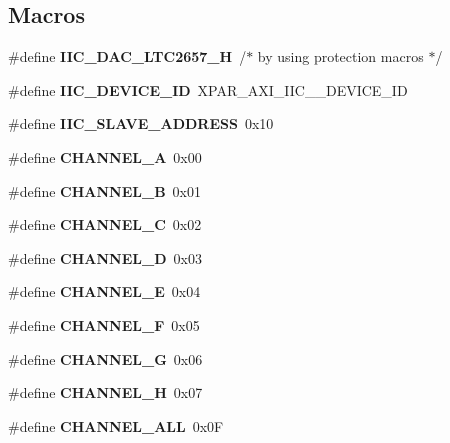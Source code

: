 \subsection*{Macros}
\begin{DoxyCompactItemize}
\item 
\mbox{\label{iic___d_a_c___l_t_c2657_8h_a6f97f5840f25f052ecd761e57bc11d4b}} 
\#define {\bfseries I\+I\+C\+\_\+\+D\+A\+C\+\_\+\+L\+T\+C2657\+\_\+H}~/$\ast$ by using protection macros $\ast$/
\item 
\mbox{\label{iic___d_a_c___l_t_c2657_8h_a0e6e0ffd0c4cccde95481cdd329e887a}} 
\#define {\bfseries I\+I\+C\+\_\+\+D\+E\+V\+I\+C\+E\+\_\+\+ID}~X\+P\+A\+R\+\_\+\+A\+X\+I\+\_\+\+I\+I\+C\+\_\+\_\+\+D\+E\+V\+I\+C\+E\+\_\+\+ID
\item 
\mbox{\label{iic___d_a_c___l_t_c2657_8h_a7f689be1799011edd5f489aac3e9153e}} 
\#define {\bfseries I\+I\+C\+\_\+\+S\+L\+A\+V\+E\+\_\+\+A\+D\+D\+R\+E\+SS}~0x10
\item 
\mbox{\label{iic___d_a_c___l_t_c2657_8h_ac0d7906cb15245de34095a6b4885e7f2}} 
\#define {\bfseries C\+H\+A\+N\+N\+E\+L\+\_\+A}~0x00
\item 
\mbox{\label{iic___d_a_c___l_t_c2657_8h_a0dd7f83e17aef557e421aae81d420e35}} 
\#define {\bfseries C\+H\+A\+N\+N\+E\+L\+\_\+B}~0x01
\item 
\mbox{\label{iic___d_a_c___l_t_c2657_8h_a40c7502184031ecffb444903756bffd6}} 
\#define {\bfseries C\+H\+A\+N\+N\+E\+L\+\_\+C}~0x02
\item 
\mbox{\label{iic___d_a_c___l_t_c2657_8h_a5fcb80e10b36c7bbf78e2a10995163fb}} 
\#define {\bfseries C\+H\+A\+N\+N\+E\+L\+\_\+D}~0x03
\item 
\mbox{\label{iic___d_a_c___l_t_c2657_8h_a40ed4915f367ae1590a5c97d2741234c}} 
\#define {\bfseries C\+H\+A\+N\+N\+E\+L\+\_\+E}~0x04
\item 
\mbox{\label{iic___d_a_c___l_t_c2657_8h_a39a5c618c958cafb4805405275a38078}} 
\#define {\bfseries C\+H\+A\+N\+N\+E\+L\+\_\+F}~0x05
\item 
\mbox{\label{iic___d_a_c___l_t_c2657_8h_a61c7328e62fb5f5a7e114940561b43e1}} 
\#define {\bfseries C\+H\+A\+N\+N\+E\+L\+\_\+G}~0x06
\item 
\mbox{\label{iic___d_a_c___l_t_c2657_8h_a104804e3fa6e19f7c59d27b10b7c3cb7}} 
\#define {\bfseries C\+H\+A\+N\+N\+E\+L\+\_\+H}~0x07
\item 
\mbox{\label{iic___d_a_c___l_t_c2657_8h_a22bebb2d35ffb38b9bb202e88822d74c}} 
\#define {\bfseries C\+H\+A\+N\+N\+E\+L\+\_\+\+A\+LL}~0x0F
\item 

\end{DoxyCompactItemize}
